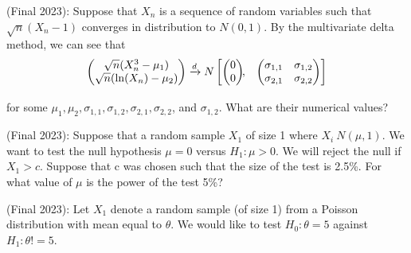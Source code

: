 \documentclass[answers]{exam}
\begin{document}
\begin{questions}
\begin{solution}
\end{solution} 

\question (Final 2023): Suppose that $X_n$ is a sequence of random variables such that $\sqrt{n}(X_n-1)$ converges in distribution to $N(0,1)$. By the multivariate delta method, we can see that
\begin{align*}
    \begin{pmatrix}
    \sqrt{n}(X_n^3-\mu_1)\\
    \sqrt{n}(\ln(X_n) - \mu_2)\\
    \end{pmatrix} 
    &\xrightarrow{d}  N
    \begin{bmatrix}
    \begin{pmatrix}
    0\\
    0
    \end{pmatrix}\!\!,&
    \begin{pmatrix}
    \sigma_{1,1} & \sigma_{1,2}\\
    \sigma_{2,1} & \sigma_{2,2}
    \end{pmatrix}
    \end{bmatrix}\\[2\jot]
    \end{align*}
for some $\mu_1, \mu_2, \sigma_{1,1}, \sigma_{1,2}, \sigma_{2,1}, \sigma_{2,2}$, and $\sigma_{1,2}$. What are their numerical values?
\begin{solution}
\end{solution}

\question (Final 2023): Suppose that a random sample $X_1$ of size 1 where $X_i ~ N(\mu,1)$. We want to test the null hypothesis $\mu=0$ versus $H_1: \mu > 0$. We will reject the null if $X_1 > c$. Suppose that c was chosen such that the size of the test is 2.5\%. For what value of $\mu$ is the power of the test 5\%?
\begin{solution}
\end{solution}

\question (Final 2023): Let $X_1$ denote a random sample (of size 1) from a Poisson distribution with mean equal to $\theta$. We would like to test $H_0 : \theta = 5$ against $H_1 : \theta != 5$. 
\end{questions}
\end{document}
